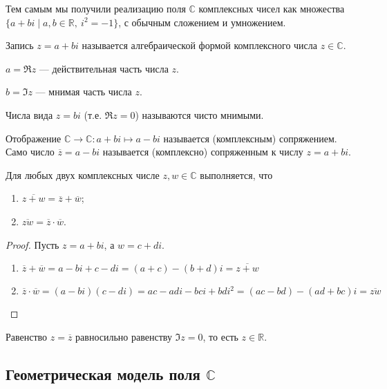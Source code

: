 Тем самым мы получили реализацию поля $\mathbb{C}$ комплексных чисел как множества \\ $\{a + bi \mid a, b \in \mathbb{R},\ i^2 = -1\}$, с обычным сложением и умножением.

\begin{Def}
Запись $z = a + bi$ называется алгебраической формой комплексного числа $z \in \mathbb{C}$.


$a = \Re z$ — действительная часть числа $z$.


$b = \Im z$ — мнимая часть числа $z$.
\end{Def}

\begin{Def}
Числа вида $z = bi$ (т.е. $\Re z = 0$) называются чисто мнимыми.
\end{Def}

\begin{Def}
Отображение $\mathbb{C} \rightarrow \mathbb{C} : a + bi \mapsto a - bi$ называется (комплексным) сопряжением. Само число $\overline{z} = a - bi$ называется (комплексно) сопряженным к числу $z = a + bi$. 
\end{Def}

\begin{Lemma}
Для любых двух комплексных числе $z, w \in \mathbb{C}$ выполняется, что
\begin{enumerate}
\item $\overline{z + w} = \overline{z} + \overline{w}$;
\item $\overline{zw} = \overline{z} \cdot \overline{w}$.
\end{enumerate}
\end{Lemma}

\begin{proof}
Пусть $z = a + bi$, а $w = c + di$. 
\begin{enumerate}
\item $\overline{z} + \overline{w} = a - bi + c - di = (a + c) - (b + d)i = \overline{z+ w}$
\item $\overline{z} \cdot \overline{w} = (a - bi)(c - di) = ac - adi - bci + bdi^2 = (ac - bd) - (ad + bc)i = \overline{zw}$
\end{enumerate}
\end{proof}

\begin{Comment}
Равенство $z = \overline{z}$ равносильно равенству $\Im z = 0$, то есть $z \in \mathbb{R}$.
\end{Comment}

\subsection{Геометрическая модель поля $\mathbb{C}$}

